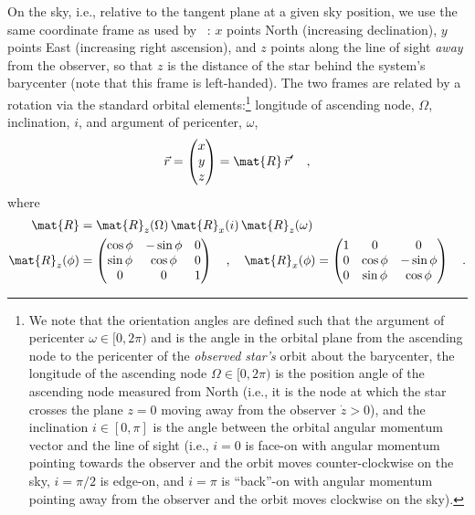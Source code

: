 \documentclass[twocolumn]{AASTeX7/aastex701}
\begin{document}
On the sky, i.e., relative to the tangent plane at a given sky position, we use the same
coordinate frame as used by \gaia\ \citep{Halbwachs:2023}: $x$ points North (increasing
declination), $y$ points East (increasing right ascension), and $z$ points along the
line of sight \emph{away} from the observer, so that $z$ is the distance of the star
behind the system's barycenter (note that this frame is left-handed).
The two frames are related by a rotation via the standard orbital elements:\footnote{We
note that the orientation angles are defined such that the argument of pericenter
$\omega \in [0, 2\pi)$ and is the angle in the orbital plane from the ascending node to
the pericenter of the \textit{observed star's} orbit about the barycenter, the longitude
of the ascending node $\Omega \in [0, 2\pi)$ is the position angle of the ascending node
measured from North (i.e., it is the node at which the star crosses the plane $z=0$
moving away from the observer $\dot{z} > 0$), and the inclination $i \in [0, \pi]$ is
the angle between the orbital angular momentum vector and the line of sight (i.e., $i=0$
is face-on with angular momentum pointing towards the observer and the orbit moves
counter-clockwise on the sky, $i=\pi/2$ is edge-on, and $i=\pi$ is ``back''-on with
angular momentum pointing away from the observer and the orbit moves clockwise on the
sky).} longitude of ascending node, $\Omega$, inclination, $i$, and argument of
pericenter, $\omega$,
\begin{equation}
  \vec{r} =
  \begin{pmatrix} x \\ y \\ z \end{pmatrix} =
  \mat{R}\,\vec{r}'
  \quad ,
\end{equation}
where
\begin{align}
  \mat{R} &= \mat{R}_z(\Omega)\,\mat{R}_x(i)\,\mat{R}_z(\omega) \\
  \mat{R}_z(\phi) &=
    \begin{pmatrix}
      \cos\phi & -\sin\phi & 0 \\
      \sin\phi & \cos\phi & 0 \\
      0 & 0 & 1
    \end{pmatrix} \quad , \quad
  \mat{R}_x(\phi) =
    \begin{pmatrix}
      1 & 0 & 0 \\
      0 & \cos\phi & -\sin\phi \\
      0 & \sin\phi & \cos\phi
    \end{pmatrix}
  \quad .
\end{align}
\end{document}
